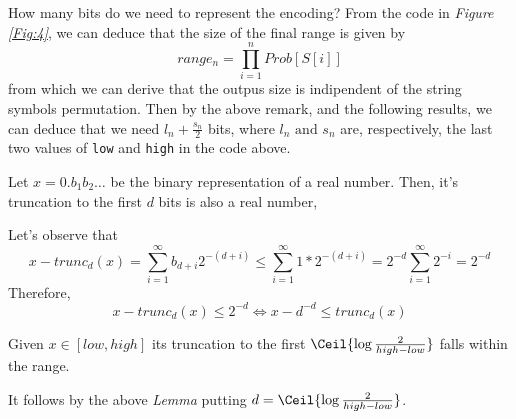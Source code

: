 \documentclass{subfiles}
\begin{document}
        How many bits do we need to represent the encoding? 
        From the code in \emph{Figure \ref{Fig:4}},
            we can deduce that the size of the final range is given by 
            \[
                range_{n} = \prod_{i = 1}^{n}{Prob[S[i]]}
            \]
            from which we can derive that the outpus size is indipendent of the 
            string symbols permutation.
        Then by the above remark, and the following results, 
            we can deduce that we need \(l_{n} + \tfrac{s_{n}}{2}\) bits,
            where \(l_{n} \text{ and } s_{n}\) are, respectively,
            the last two values of \lstinline{low} and \lstinline{high} in the code above.
        \begin{lemma*}
            Let \(x = 0.b_{1}b_{2}\ldots\) be the binary representation of a real number.
            Then, it's truncation to the first \(d\) bits is also a real number,
        \end{lemma*}
        \begin{proof*}
            Let's observe that 
            \[
                x - trunc_{d}(x) = \sum_{i = 1}^{\infty}{b_{d + i} 2^{-(d + i)}}
                \le \sum_{i = 1}^{\infty}{1 * 2^{-(d + i)}} 
                =2^{-d} \sum_{i = 1}^{\infty}{2^{-i}} = 2^{-d}
            \]
            Therefore, 
            \[
                x - trunc_{d}(x) \le 2^{-d} \iff x - d^{-d} \le trunc_{d}(x)
            \]
        \end{proof*}
        \begin{corollary*}
            Given \(x \in [low, high]\) its truncation to the first
            \(\Ceil{\log \tfrac{2}{high - low}}\) falls within the range.
        \end{corollary*}
        \begin{proof*}
            It follows by the above \emph{Lemma} putting 
                \(d = \Ceil{\log \tfrac{2}{high - low}}\).
        \end{proof*}
\end{document}
